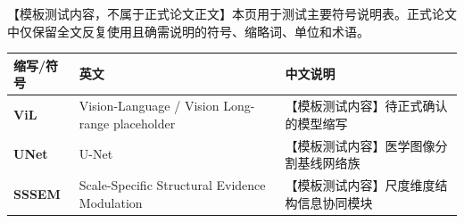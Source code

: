 
【模板测试内容，不属于正式论文正文】本页用于测试主要符号说明表。正式论文中仅保留全文反复使用且确需说明的符号、缩略词、单位和术语。

\begin{longtable}{>{\bfseries}p{}p{}p{}}
\toprule
缩写/符号 & 英文 & 中文说明 \\
\midrule
ViL & Vision-Language / Vision Long-range placeholder & 【模板测试内容】待正式确认的模型缩写 \\
UNet & U-Net & 【模板测试内容】医学图像分割基线网络族 \\
SSSEM & Scale-Specific Structural Evidence Modulation & 【模板测试内容】尺度维度结构信息协同模块 \\
\bottomrule
\end{longtable}

